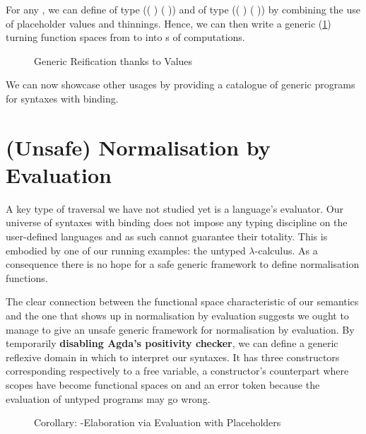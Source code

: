 For any  , we can define  of
type {(( )  ( \AF{++} ))} and  of
type {(( )  ( \AF{++} ))} by combining the use
of placeholder values and thinnings. Hence, we can then write a generic 
(\cref{fig:kripkereify}) turning  function spaces from  to 
into s of  computations.

\begin{figure}[h]
\caption{Generic Reification thanks to  Values\label{fig:kripkereify}}
\end{figure}

We can now showcase other usages by providing a catalogue of generic programs
for syntaxes with binding.





\section{(Unsafe) Normalisation by Evaluation}\label{section:unsafenbyeval}

A key type of traversal we have not studied yet is a language's evaluator. Our
universe of syntaxes with binding does not impose any typing discipline on the
user-defined languages and as such cannot guarantee their totality. This is
embodied by one of our running examples: the untyped $\lambda$-calculus. As a
consequence there is no hope for a safe generic framework to define normalisation
functions.

The clear connection between the  functional space characteristic of
our semantics and the one that shows up in normalisation by evaluation suggests
we ought to manage to give an unsafe generic framework for normalisation by evaluation.
By temporarily \textbf{disabling Agda's positivity checker}, we can define a
generic reflexive domain  in which to interpret our syntaxes. It has three
constructors corresponding respectively to a free variable, a constructor's
counterpart where scopes have become  functional spaces on 
and an error token because the evaluation of untyped programs may go wrong.

\begin{figure}[h]
\caption{Corollary: -Elaboration via Evaluation with Placeholders}
\end{figure}


